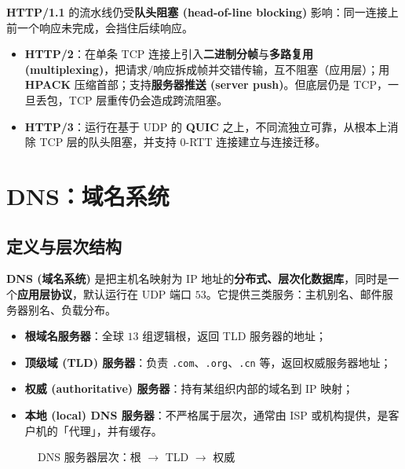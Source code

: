 \textbf{HTTP/1.1} 的流水线仍受\textbf{队头阻塞 (head-of-line blocking)} 影响：同一连接上前一个响应未完成，会挡住后续响应。

\begin{itemize}
    \item \textbf{HTTP/2}：在单条 TCP 连接上引入\textbf{二进制分帧}与\textbf{多路复用 (multiplexing)}，把请求/响应拆成帧并交错传输，互不阻塞（应用层）；用 \textbf{HPACK} 压缩首部；支持\textbf{服务器推送 (server push)}。但底层仍是 TCP，一旦丢包，TCP 层重传仍会造成跨流阻塞。
    \item \textbf{HTTP/3}：运行在基于 UDP 的 \textbf{QUIC} 之上，不同流独立可靠，从根本上消除 TCP 层的队头阻塞，并支持 $0$-RTT 连接建立与连接迁移。
\end{itemize}

\section{DNS：域名系统}

\subsection{定义与层次结构}

\textbf{DNS (域名系统)} 是把主机名映射为 IP 地址的\textbf{分布式、层次化数据库}，同时是一个\textbf{应用层协议}，默认运行在 UDP 端口 $53$。它提供三类服务：主机别名、邮件服务器别名、负载分布。

\begin{itemize}
    \item \textbf{根域名服务器}：全球 $13$ 组逻辑根，返回 TLD 服务器的地址；
    \item \textbf{顶级域 (TLD) 服务器}：负责 \texttt{.com}、\texttt{.org}、\texttt{.cn} 等，返回权威服务器地址；
    \item \textbf{权威 (authoritative) 服务器}：持有某组织内部的域名到 IP 映射；
    \item \textbf{本地 (local) DNS 服务器}：不严格属于层次，通常由 ISP 或机构提供，是客户机的「代理」，并有缓存。
\end{itemize}

\begin{figure}[H]
\centering
{}
\caption{DNS 服务器层次：根 $\to$ TLD $\to$ 权威}
\label{fig:dns_hierarchy}
\end{figure}

